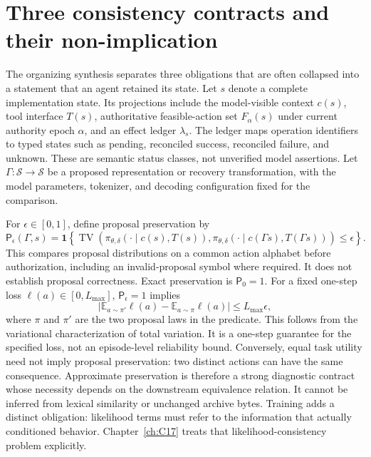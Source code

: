 \section{Three consistency contracts and their non-implication}
\label{sec:C01:contracts}
The organizing synthesis separates three obligations that are often collapsed into a statement that an agent retained its state. Let $s$ denote a complete implementation state. Its projections include the model-visible context $c(s)$, tool interface $T(s)$, authoritative feasible-action set $F_\alpha(s)$ under current authority epoch $\alpha$, and an effect ledger $\lambda_s$. The ledger maps operation identifiers to typed states such as pending, reconciled success, reconciled failure, and unknown. These are semantic status classes, not unverified model assertions. Let $\Gamma:\mathcal S\to\mathcal S$ be a proposed representation or recovery transformation, with the model parameters, tokenizer, and decoding configuration fixed for the comparison.

For $\epsilon\in[0,1]$, define proposal preservation by
\begin{equation}
 \mathsf P_\epsilon(\Gamma,s)=
 \mathbf1\!\left\{
 \operatorname{TV}\!\left(
 \pi_{\theta,\delta}(\cdot\mid c(s),T(s)),
 \pi_{\theta,\delta}(\cdot\mid c(\Gamma s),T(\Gamma s))
 \right)\leq\epsilon\right\}.
\end{equation}
This compares proposal distributions on a common action alphabet before authorization, including an invalid-proposal symbol where required. It does not establish proposal correctness. Exact preservation is $\mathsf P_0=1$. For a fixed one-step loss $\ell(a)\in[0,L_{\max}]$, $\mathsf P_\epsilon=1$ implies
\begin{equation}
 \left|\mathbb E_{a\sim\pi'}\ell(a)-\mathbb E_{a\sim\pi}\ell(a)\right|
 \leq L_{\max}\epsilon,
\end{equation}
where $\pi$ and $\pi'$ are the two proposal laws in the predicate. This follows from the variational characterization of total variation. It is a one-step guarantee for the specified loss, not an episode-level reliability bound. Conversely, equal task utility need not imply proposal preservation: two distinct actions can have the same consequence. Approximate preservation is therefore a strong diagnostic contract whose necessity depends on the downstream equivalence relation. It cannot be inferred from lexical similarity or unchanged archive bytes. Training adds a distinct obligation: likelihood terms must refer to the information that actually conditioned behavior. Chapter~\ref{ch:C17} treats that likelihood-consistency problem explicitly.

